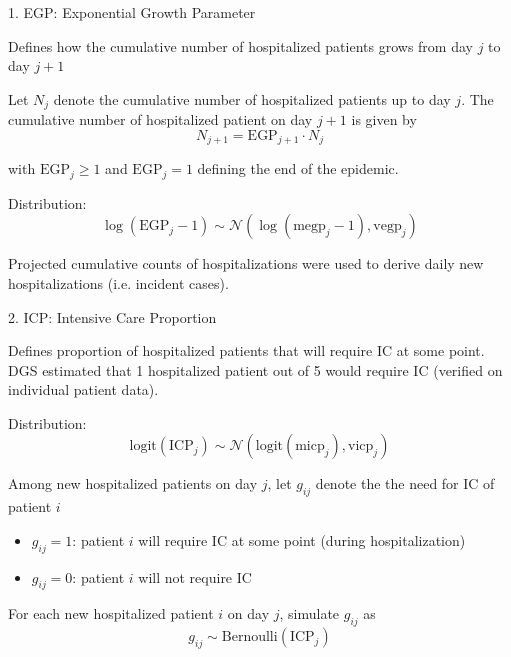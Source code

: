 \documentclass[t,9pt,xcolor=dvipsnames]{beamer}              %
\begin{document}
\begin{frame}{1. EGP: Exponential Growth Parameter}

Defines how the \alert{cumulative number of hospitalized patients} grows from day $j$ to day $j+1$

Let $N_{j}$ denote the cumulative number of hospitalized patients up to day $j$. The cumulative number of hospitalized patient on day $j+1$ is  given by
\begin{equation*}
N_{j+1}= \text{EGP}_{j+1} \cdot N_{j}
\end{equation*}

with $\text{EGP}_{j} \geq 1$ and $\text{EGP}_{j}=1$ defining the end of the epidemic.
\medskip

Distribution:
\begin{equation*}
\log(\text{EGP}_{j}-1) \sim \mathcal{N}\left(\log(\text{megp}_{j}-1), \text{vegp}_{j}\right)
\end{equation*}
\medskip

Projected cumulative counts of hospitalizations were used to derive daily new hospitalizations (i.e. incident cases).

\note{
\tiny
\justifying

}
\end{frame}

\begin{frame}{2. ICP: Intensive Care Proportion}

Defines proportion of hospitalized patients that will require IC at some point. DGS estimated that 1 hospitalized patient out of 5 would require IC (verified on individual patient data).
\medskip

Distribution:
\begin{equation*}
\text{logit}(\text{ICP}_{j}) \sim \mathcal{N}\left(\text{logit}(\text{micp}_{j}), \text{vicp}_{j}\right)
\end{equation*}
\medskip

\alert{Among new hospitalized patients on day $j$}, let $g_{ij}$ denote the the need for IC of patient $i$
\begin{itemize}
\item $g_{ij}=1$: patient $i$ will require IC at some point (during hospitalization)
\item $g_{ij}=0$: patient $i$ will not require IC
\end{itemize}

For each new hospitalized patient $i$ on day $j$, simulate $g_{ij}$ as
\begin{equation*}
g_{ij} \sim \text{Bernoulli}\left(\text{ICP}_{j}\right)
\end{equation*} 

\note{
\tiny
\justifying

}
\end{frame}
\end{document}

